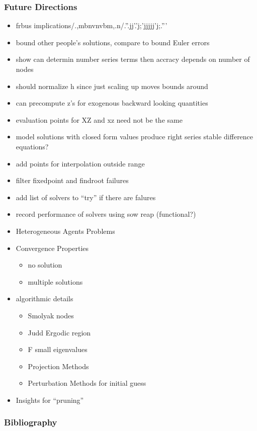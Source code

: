 \documentclass[tikz]{beamer}
\begin{document}
\begin{frame}
  \frametitle{Future Directions}
  \begin{itemize}
  \item frbus implications/.,mbnvnvbm,.n/.''.jj'.'j;'jjjjj'j;.'''
  \item bound other people's solutions, compare to bound Euler errors
  \item show can determin number series terms then accracy depends on number of nodes
  \item should normalize h since just scaling up moves bounds around
  \item can precompute z's for exogenous backward looking quantities
  \item evaluation points for XZ and xz need not be the same
  \item model solutions with closed form values produce right series stable difference equations?
  \item add points for interpolation outside range
  \item filter fixedpoint and findroot failures
  \item add list of solvers to ``try'' if there are falures
  \item record performance of solvers using sow reap (functional?)
  \item Heterogeneous Agents Problems
  \item Convergence Properties
    \begin{itemize}
    \item no solution
    \item multiple solutions
    \end{itemize}
\item algorithmic details
  \begin{itemize}
 \item Smolyak nodes
 \item Judd Ergodic region
 \item F small eigenvalues
 \item Projection Methods
 \item Perturbation Methods for initial guess
  \end{itemize}
\item Insights for ``pruning''
  \end{itemize}
\end{frame}

\begin{frame}
  \frametitle{Bibliography}
  


\end{frame}

\appendix
\end{document}
